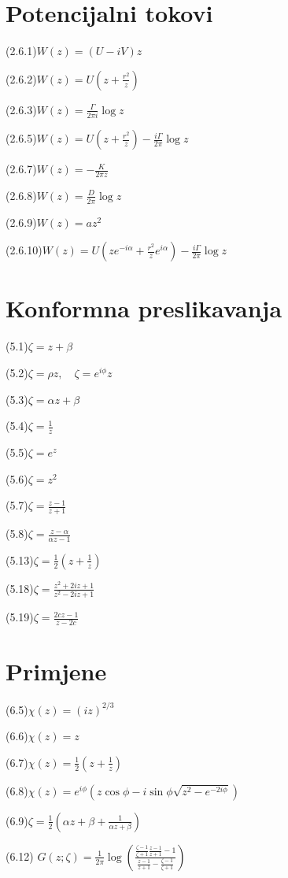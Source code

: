 \documentclass{article}
\begin{document}
\section*{Potencijalni tokovi}

(2.6.1)\quad $W(z)=(U-iV)z$

(2.6.2)\quad $W(z)=U\left(z+\frac{r^2}{z}\right)$

(2.6.3)\quad $W(z)=\frac{\Gamma}{2\pi i}\log z$

(2.6.5)\quad $W(z)=U\left(z+\frac{r^2}{z}\right)-\frac{i\Gamma}{2\pi}\log z$

(2.6.7)\quad $W(z)=-\frac{K}{2\pi z}$

(2.6.8)\quad $W(z)=\frac{D}{2\pi}\log z$

(2.6.9)\quad $W(z)=az^2$

(2.6.10)\quad $W(z)=U\left(ze^{-i\alpha}+\frac{r^2}{z}e^{i\alpha}\right)-\frac{i\Gamma}{2\pi}\log z$

\section*{Konformna preslikavanja}

(5.1)\quad $\zeta=z+\beta$

(5.2)\quad $\zeta=\rho z,\quad \zeta=e^{i\phi}z$

(5.3)\quad $\zeta=\alpha z+\beta$

(5.4)\quad $\zeta=\frac{1}{z}$

(5.5)\quad $\zeta=e^{z}$

(5.6)\quad $\zeta=z^2$

(5.7)\quad $\zeta=\frac{z-1}{z+1}$

(5.8)\quad $\zeta=\frac{z-\alpha}{\alpha z-1}$

(5.13)\quad $\zeta=\frac12\left(z+\frac{1}{z}\right)$

(5.18)\quad $\zeta=\frac{z^2+2iz+1}{z^2-2iz+1}$

(5.19)\quad $\zeta=\frac{2cz-1}{z-2c}$

\section*{Primjene}

(6.5)\quad $\chi(z)=(iz)^{2/3}$

(6.6)\quad $\chi(z)=z$

(6.7)\quad $\chi(z)=\frac12\left(z+\frac{1}{z}\right)$

(6.8)\quad $\chi(z)=e^{i\phi}\left(z\cos\phi-i\sin\phi\sqrt{z^2-e^{-2i\phi}}\right)$

(6.9)\quad $\zeta=\frac12\left(\alpha z+\beta+\frac{1}{\alpha z+\beta}\right)$

(6.12)\quad 
$G(z;\zeta)=\frac{1}{2\pi}\log\!\left(
\frac{\frac{\zeta-1}{\zeta+1}\frac{z-1}{z+1}-1}
{\frac{z-1}{z+1}-\frac{\zeta-1}{\zeta+1}}
\right)$
\end{document}
